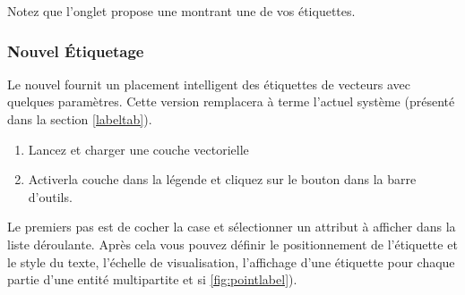 Notez que l'onglet  propose une  
montrant une de vos étiquettes.


\subsubsection{Nouvel Étiquetage}\label{newlabel}

Le nouvel  fournit un placement intelligent des 
étiquettes de vecteurs avec quelques paramètres. Cette version remplacera à terme 
l'actuel système (présenté dans la section \ref{labeltab}). 


\begin{enumerate}
  \item  Lancez \qg et charger une couche vectorielle
  \item Activerla couche dans la légende et cliquez sur le bouton 
   dans la barre d'outils.
\end{enumerate}


Le premiers pas est de cocher la case  et sélectionner un attribut à afficher dans la liste déroulante. Après cela vous pouvez définir le positionnement de l'étiquette et le style du texte, l'échelle de visualisation, l'affichage d'une étiquette pour chaque partie d'une entité multipartite et si \ref{fig:pointlabel}).

